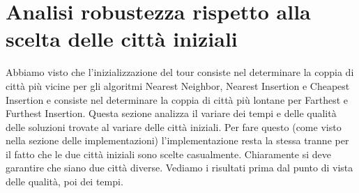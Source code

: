 \documentclass[a4paper,12pt]{report}
\begin{document}
\section{Analisi robustezza rispetto alla scelta delle città iniziali}
Abbiamo visto che l'inizializzazione del tour consiste nel determinare la coppia di città più vicine per gli algoritmi Nearest Neighbor, Nearest Insertion e Cheapest Insertion e consiste nel determinare la coppia di città più lontane per Farthest e Furthest Insertion. Questa sezione analizza il variare dei tempi e delle qualità delle soluzioni trovate al variare delle città iniziali. Per fare questo (come visto nella sezione delle implementazioni) l'implementazione resta la stessa tranne per il fatto che le due città iniziali sono scelte casualmente. Chiaramente si deve garantire che siano due città diverse. Vediamo i risultati prima dal punto di vista delle qualità, poi dei tempi.
\end{document}
